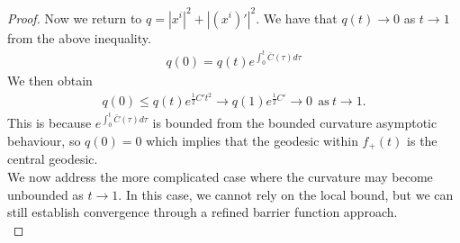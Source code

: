 \documentclass[pdflatex,sn-mathphys-num]{sn-jnl}
\theoremstyle{definition}
\begin{document}
\begin{proof}
Now we return to $q = {|x^i |}^2 + {|(x^i)'|}^2$. We have that $q(t) \rightarrow 0$ as $t \rightarrow 1$ from the above inequality.
\begin{align*}
    q(0) = q(t)e^{\int_0^{t}\bar{C}(\tau) d\tau}
\end{align*}
We then obtain
\begin{align*}
    q(0) \leq q(t)e^{\frac{1}{2}C't^2} \rightarrow q(1)e^{\frac{1}{2}C'} \rightarrow 0~~\text{as}~t \rightarrow 1.
\end{align*}
This is because $e^{\int_0^{t}\bar{C} (\tau) d\tau}$ is bounded from the bounded curvature asymptotic behaviour, so $q(0) = 0$ which implies that the geodesic within $f_+(t)$ is the central geodesic.\\


We now address the more complicated case where the curvature may become unbounded as $t \rightarrow 1$. In this case, we cannot rely on the local bound, but we can still establish convergence through a refined barrier function approach.\\


\end{proof}
\end{document}
